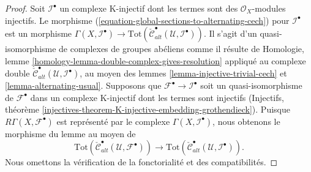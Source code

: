 \begin{proof}

Soit ${\mathcal I}^\bullet$ un complexe K-injectif dont les termes sont des $\mathcal{O}_X$-modules injectifs. Le morphisme (\ref{equation-global-sections-to-alternating-cech}) pour
$\mathcal{I}^\bullet$ est un morphisme
$\Gamma(X, {\mathcal I}^\bullet) \to
\text{Tot}(\check{\mathcal{C}}^\bullet_{alt}({\mathcal U},
{\mathcal I}^\bullet))$. Il s'agit d'un quasi-isomorphisme de complexes de groupes abéliens comme il résulte de Homologie, lemme \ref{homology-lemma-double-complex-gives-resolution}
appliqué au complexe double
$\check{\mathcal{C}}^\bullet_{alt}({\mathcal U},
{\mathcal I}^\bullet)$, au moyen des lemmes \ref{lemma-injective-trivial-cech} et \ref{lemma-alternating-usual}. Supposons que ${\mathcal F}^\bullet \to {\mathcal I}^\bullet$ soit un quasi-isomorphisme de ${\mathcal F}^\bullet$ dans un complexe K-injectif dont les termes sont injectifs (Injectifs, théorème
\ref{injectives-theorem-K-injective-embedding-grothendieck}). Puisque $R\Gamma(X, {\mathcal F}^\bullet)$ est représenté par le complexe
$\Gamma(X, {\mathcal I}^\bullet)$, nous obtenons le morphisme du lemme au moyen de
$$
\text{Tot}(\check{\mathcal{C}}^\bullet_{alt}({\mathcal U},
{\mathcal F}^\bullet))
\longrightarrow
\text{Tot}(\check{\mathcal{C}}^\bullet_{alt}({\mathcal U},
{\mathcal I}^\bullet)).
$$
Nous omettons la vérification de la fonctorialité et des compatibilités.

\end{proof}

